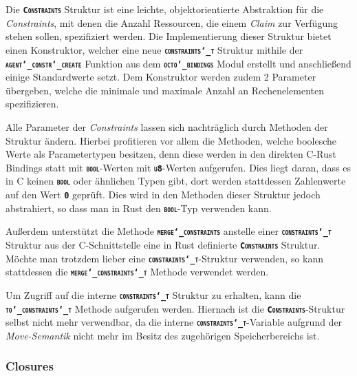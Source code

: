 Die \texttt{\textsc{\textbf{Constraints}}} Struktur ist eine leichte,
objektorientierte Abstraktion für die \textit{Constraints}, mit denen die Anzahl Ressourcen,
die einem \textit{Claim} zur Verfügung stehen sollen, spezifiziert werden.
Die Implementierung dieser Struktur bietet einen Konstruktor, welcher eine neue
\texttt{\textsc{\textbf{constraints\char`_t}}} Struktur mithile der
\texttt{\textsc{\textbf{agent\char`_constr\char`_create}}}
Funktion aus dem \texttt{\textsc{\textbf{octo\char`_bindings}}} Modul erstellt und anschließend einige Standardwerte setzt. 
Dem Konstruktor werden zudem 2 Parameter übergeben,
welche die minimale und maximale Anzahl an Rechenelementen spezifizieren.

Alle Parameter der \textit{Constraints} lassen sich nachträglich durch Methoden der Struktur ändern.
Hierbei profitieren vor allem die Methoden, welche boolesche Werte als Parametertypen besitzen,
denn diese werden in den direkten C-Rust Bindings statt mit \texttt{\textsc{\textbf{bool}}}-Werten mit
\texttt{\textsc{\textbf{u8}}}-Werten aufgerufen. Dies liegt daran, dass es in C keinen
\texttt{\textsc{\textbf{bool}}} oder ähnlichen Typen gibt, dort werden stattdessen Zahlenwerte auf den
Wert \texttt{\textsc{\textbf{0}}} geprüft. Dies wird in den Methoden dieser Struktur jedoch abstrahiert,
so dass man in Rust den \texttt{\textsc{\textbf{bool}}}-Typ verwenden kann.

Außerdem unterstützt die Methode \texttt{\textsc{\textbf{merge\char`_constraints}}} anstelle einer
\texttt{\textsc{\textbf{constraints\char`_t}}} Struktur aus der C-Schnittstelle eine in Rust definierte
\texttt{\textsc{\textbf{Constraints}}} Struktur. Möchte man trotzdem lieber eine
\texttt{\textsc{\textbf{constraints\char`_t}}}-Struktur verwenden, so kann stattdessen die
\texttt{\textsc{\textbf{merge\char`_constraints\char`_t}}} Methode verwendet werden.

Um Zugriff auf die interne \texttt{\textsc{\textbf{constraints\char`_t}}} Struktur zu erhalten, kann die
\texttt{\textsc{\textbf{to\char`_constraints\char`_t}}} Methode aufgerufen werden.
Hiernach ist die \texttt{\textsc{\textbf{Constraints}}}-Struktur selbst nicht mehr verwendbar,
da die interne \texttt{\textsc{\textbf{constraints\char`_t}}}-Variable aufgrund der \textit{Move-Semantik}
nicht mehr im Besitz des zugehörigen Speicherbereichs ist.

\subsubsection{Closures}

